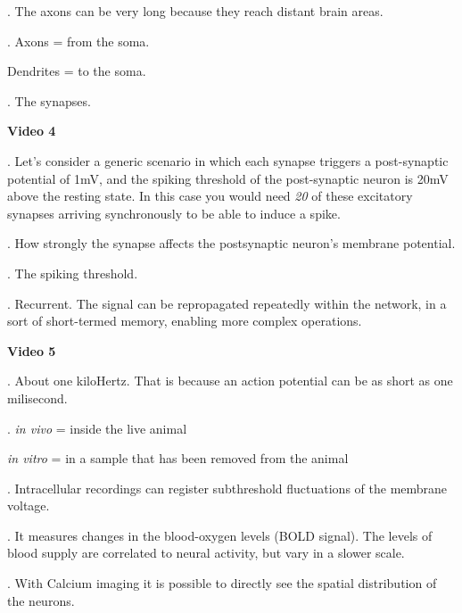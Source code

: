 \documentclass[a4paper,12pt]{article}
\begin{document}
. The axons can be very long because they reach distant brain areas.

. Axons = from the soma.

Dendrites = to the soma.

. The synapses.


\vspace{0.5cm}

\noindent\normalsize\textbf{Video 4}

. Let's consider a generic scenario in which each synapse triggers a post-synaptic potential of 1mV, and the spiking threshold of the post-synaptic neuron is 20mV above the resting state. In this case you would need \emph{20} of these excitatory synapses arriving synchronously to be able to induce a spike.

. How strongly the synapse affects the postsynaptic neuron's membrane potential.

. The spiking threshold.

. Recurrent. The signal can be repropagated repeatedly within the network, in a sort of short-termed memory, enabling more complex operations. 

\vspace{0.5cm}

\noindent\normalsize\textbf{Video 5}

. About one kiloHertz. That is because an action potential can be as short as one milisecond.

. \emph{in vivo} = inside the live animal

\emph{in vitro} = in a sample that has been removed from the animal

. Intracellular recordings can register subthreshold fluctuations of the membrane voltage.

. It measures changes in the blood-oxygen levels (BOLD signal). The levels of blood supply are correlated to neural activity, but vary in a slower scale.

. With Calcium imaging it is possible to directly see the spatial distribution of the neurons. 
\end{document}
